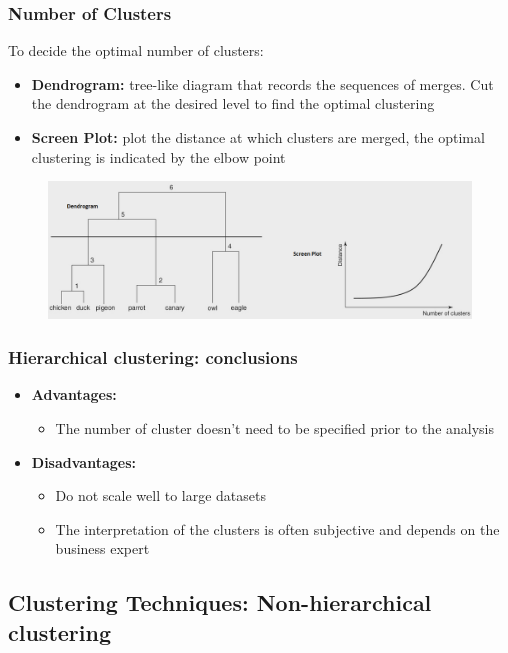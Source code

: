     \subsubsection{Number of Clusters}
        To decide the optimal number of clusters:
        \begin{itemize}
            \item \textbf{Dendrogram:} tree-like diagram that records the sequences of merges. Cut the dendrogram at the desired level to find the optimal clustering
            \item \textbf{Screen Plot:} plot the distance at which clusters are merged, the optimal clustering is indicated by the elbow point
        \end{itemize}
        \begin{figure}[ht!]
            \centering
            \includegraphics[width=0.6\linewidth]{lecture_13/dendro.png}
        \end{figure}
    \subsubsection{Hierarchical clustering: conclusions}
        \begin{itemize}
            \item \textbf{Advantages:}
            \begin{itemize}
                \item The number of cluster doesn't need to be specified prior to the analysis
            \end{itemize}
            \item \textbf{Disadvantages:}
            \begin{itemize}
                \item Do not scale well to large datasets
                \item The interpretation of the clusters is often subjective and depends on the business expert
            \end{itemize}
        \end{itemize}
\subsection{Clustering Techniques: Non-hierarchical clustering}
